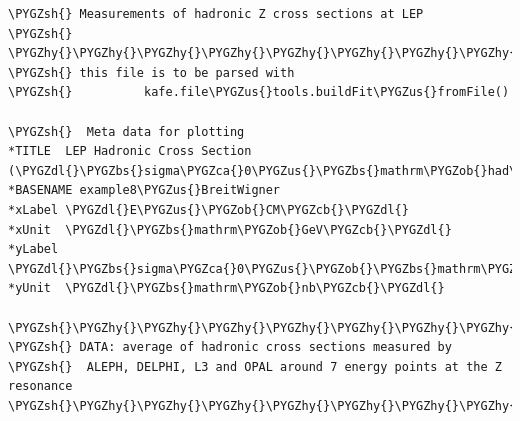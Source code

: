 \documentclass[a4paper,10pt,english]{sphinxmanual}
\def\PYGZbs{\char`\\}
\def\PYGZus{\char`\_}
\def\PYGZob{\char`\{}
\def\PYGZcb{\char`\}}
\def\PYGZca{\char`\^}
\def\PYGZsh{\char`\#}
\def\PYGZdl{\char`\$}
\def\PYGZhy{\char`\-}
\begin{document}
\begin{Verbatim}[commandchars=\\\{\}]
\PYGZsh{} Measurements of hadronic Z cross sections at LEP
\PYGZsh{} \PYGZhy{}\PYGZhy{}\PYGZhy{}\PYGZhy{}\PYGZhy{}\PYGZhy{}\PYGZhy{}\PYGZhy{}\PYGZhy{}\PYGZhy{}\PYGZhy{}\PYGZhy{}\PYGZhy{}\PYGZhy{}\PYGZhy{}\PYGZhy{}\PYGZhy{}\PYGZhy{}\PYGZhy{}\PYGZhy{}\PYGZhy{}\PYGZhy{}\PYGZhy{}\PYGZhy{}\PYGZhy{}\PYGZhy{}\PYGZhy{}\PYGZhy{}\PYGZhy{}\PYGZhy{}\PYGZhy{}\PYGZhy{}\PYGZhy{}\PYGZhy{}\PYGZhy{}\PYGZhy{}\PYGZhy{}\PYGZhy{}\PYGZhy{}\PYGZhy{}\PYGZhy{}\PYGZhy{}\PYGZhy{}\PYGZhy{}\PYGZhy{}\PYGZhy{}\PYGZhy{}\PYGZhy{}
\PYGZsh{} this file is to be parsed with
\PYGZsh{}          kafe.file\PYGZus{}tools.buildFit\PYGZus{}fromFile()

\PYGZsh{}  Meta data for plotting
*TITLE  LEP Hadronic Cross Section (\PYGZdl{}\PYGZbs{}sigma\PYGZca{}0\PYGZus{}\PYGZbs{}mathrm\PYGZob{}had\PYGZcb{}\PYGZdl{})
*BASENAME example8\PYGZus{}BreitWigner
*xLabel \PYGZdl{}E\PYGZus{}\PYGZob{}CM\PYGZcb{}\PYGZdl{}
*xUnit  \PYGZdl{}\PYGZbs{}mathrm\PYGZob{}GeV\PYGZcb{}\PYGZdl{}
*yLabel \PYGZdl{}\PYGZbs{}sigma\PYGZca{}0\PYGZus{}\PYGZob{}\PYGZbs{}mathrm\PYGZob{}had\PYGZcb{}\PYGZcb{}\PYGZdl{}
*yUnit  \PYGZdl{}\PYGZbs{}mathrm\PYGZob{}nb\PYGZcb{}\PYGZdl{}

\PYGZsh{}\PYGZhy{}\PYGZhy{}\PYGZhy{}\PYGZhy{}\PYGZhy{}\PYGZhy{}\PYGZhy{}\PYGZhy{}\PYGZhy{}\PYGZhy{}\PYGZhy{}\PYGZhy{}\PYGZhy{}\PYGZhy{}\PYGZhy{}\PYGZhy{}\PYGZhy{}\PYGZhy{}\PYGZhy{}\PYGZhy{}\PYGZhy{}\PYGZhy{}\PYGZhy{}\PYGZhy{}\PYGZhy{}\PYGZhy{}\PYGZhy{}\PYGZhy{}\PYGZhy{}\PYGZhy{}\PYGZhy{}\PYGZhy{}\PYGZhy{}\PYGZhy{}\PYGZhy{}\PYGZhy{}\PYGZhy{}\PYGZhy{}\PYGZhy{}\PYGZhy{}\PYGZhy{}\PYGZhy{}\PYGZhy{}\PYGZhy{}\PYGZhy{}\PYGZhy{}\PYGZhy{}\PYGZhy{}\PYGZhy{}\PYGZhy{}\PYGZhy{}\PYGZhy{}\PYGZhy{}\PYGZhy{}\PYGZhy{}\PYGZhy{}\PYGZhy{}\PYGZhy{}\PYGZhy{}\PYGZhy{}\PYGZhy{}\PYGZhy{}\PYGZhy{}\PYGZhy{}\PYGZhy{}\PYGZhy{}\PYGZhy{}\PYGZhy{}\PYGZhy{}\PYGZhy{}
\PYGZsh{} DATA: average of hadronic cross sections measured by
\PYGZsh{}  ALEPH, DELPHI, L3 and OPAL around 7 energy points at the Z resonance
\PYGZsh{}\PYGZhy{}\PYGZhy{}\PYGZhy{}\PYGZhy{}\PYGZhy{}\PYGZhy{}\PYGZhy{}\PYGZhy{}\PYGZhy{}\PYGZhy{}\PYGZhy{}\PYGZhy{}\PYGZhy{}\PYGZhy{}\PYGZhy{}\PYGZhy{}\PYGZhy{}\PYGZhy{}\PYGZhy{}\PYGZhy{}\PYGZhy{}\PYGZhy{}\PYGZhy{}\PYGZhy{}\PYGZhy{}\PYGZhy{}\PYGZhy{}\PYGZhy{}\PYGZhy{}\PYGZhy{}\PYGZhy{}\PYGZhy{}\PYGZhy{}\PYGZhy{}\PYGZhy{}\PYGZhy{}\PYGZhy{}\PYGZhy{}\PYGZhy{}\PYGZhy{}\PYGZhy{}\PYGZhy{}\PYGZhy{}\PYGZhy{}\PYGZhy{}\PYGZhy{}\PYGZhy{}\PYGZhy{}\PYGZhy{}\PYGZhy{}\PYGZhy{}\PYGZhy{}\PYGZhy{}\PYGZhy{}\PYGZhy{}\PYGZhy{}\PYGZhy{}\PYGZhy{}\PYGZhy{}\PYGZhy{}\PYGZhy{}\PYGZhy{}\PYGZhy{}\PYGZhy{}\PYGZhy{}\PYGZhy{}\PYGZhy{}\PYGZhy{}\PYGZhy{}\PYGZhy{}


\end{Verbatim}
\end{document}
